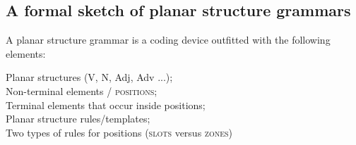 \documentclass[output=paper,hidelinks]{langscibook}
\begin{document}


\subsection{A formal sketch of planar structure grammars}
\label{sec:formal}

A planar structure grammar is a coding device outfitted with the following elements:

\ea 
    \ea Planar structures (V, N, Adj, Adv ...); \\
    \ex Non-terminal elements / \textsc{positions}; \\ 
    \ex Terminal elements that occur inside positions; \\
    \ex Planar structure rules/templates; \\
    \ex Two types of rules for positions (\textsc{slots} versus \textsc{zones}) 
    \z 
\z 
\end{document}
